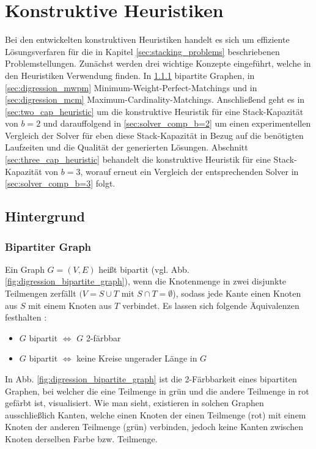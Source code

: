 \pagebreak

\section{Konstruktive Heuristiken}
\label{sec:constructive_heuristics}

Bei den entwickelten konstruktiven Heuristiken handelt es sich um effiziente Lösungsverfaren für die in Kapitel \ref{sec:stacking_problems}
beschriebenen Problemstellungen. Zunächst werden drei wichtige Konzepte eingeführt, welche in den Heuristiken Verwendung finden.
In \ref{sec:digression_bipartite_graph} bipartite Graphen, in \ref{sec:digression_mwpm} Minimum-Weight-Perfect-Matchings und in \ref{sec:digression_mcm} Maximum-Cardinality-Matchings. Anschließend geht es in \ref{sec:two_cap_heuristic} um die konstruktive Heuristik
für eine Stack-Kapazität von $b=2$ und darauffolgend in \ref{sec:solver_comp_b=2} um einen experimentellen Vergleich der Solver für
eben diese Stack-Kapazität in Bezug auf die benötigten Laufzeiten und die Qualität der generierten Lösungen.
Abschnitt \ref{sec:three_cap_heuristic} behandelt die konstruktive Heuristik für eine Stack-Kapazität von $b=3$, worauf erneut ein Vergleich der entsprechenden Solver in \ref{sec:solver_comp_b=3} folgt.

\subsection{Hintergrund}

\subsubsection{Bipartiter Graph}
\label{sec:digression_bipartite_graph}

Ein Graph $G = (V, E)$ heißt bipartit (vgl. Abb. \ref{fig:digression_bipartite_graph}), wenn die Knotenmenge in zwei disjunkte Teilmengen zerfällt
$(V = S \cup T$ mit $S \cap T = \emptyset$), sodass jede Kante einen Knoten aus $S$ mit einem Knoten aus $T$ verbindet. \cite{HochschuleDarmstadt}\newline
Es lassen sich folgende Äquivalenzen festhalten \cite{Leighton2010}:
\begin{itemize}
  \item $G$ bipartit $\iff$ $G$ 2-färbbar
  \item $G$ bipartit $\iff$ keine Kreise ungerader Länge in $G$
\end{itemize}
In Abb. \ref{fig:digression_bipartite_graph} ist die 2-Färbbarkeit eines bipartiten Graphen, bei welcher die eine Teilmenge
in grün und die andere Teilmenge in rot gefärbt ist, visualisiert. Wie man sieht, existieren in solchen Graphen
ausschließlich Kanten, welche einen Knoten der einen Teilmenge (rot) mit einem Knoten der anderen Teilmenge (grün) verbinden,
jedoch keine Kanten zwischen Knoten derselben Farbe bzw. Teilmenge.

